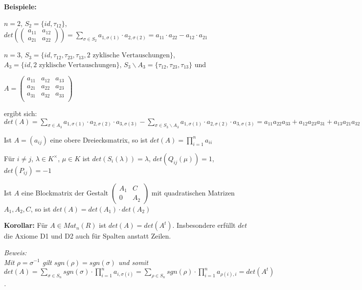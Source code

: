 \documentclass[11pt]{article}
\begin{document}
		\textbf{Beispiele:}
		\begin{compactitem}
			\item $n=2$, $S_2=\{id, \tau_{12}\}$, $det(\begin{pmatrix}a_{11} & a_{12} \\ a_{21}  & a_{22}\end{pmatrix})=\sum\limits_{\sigma\in
			S_2} a_{1,\sigma(1)}\cdot a_{2,\sigma(2)}=a_11\cdot a_22 - a_12\cdot a_21$
			\item $n=3$, $S_3=\{id,\tau_{12}, \tau_{23}, \tau_{13}, \text{2 zyklische Vertauschungen}\}$, $A_3=\{id, \text{2 zyklische 
			Vertauschungen}\}$, $S_3\backslash A_3=\{\tau_{12},\tau_{23},\tau_{13}\}$ und \\
			\begin{center}$A=\begin{pmatrix}
				a_{11} & a_{12} & a_{13} \\
				a_{21} & a_{22} & a_{23} \\
				a_{31} & a_{32} & a_{33} \\
			\end{pmatrix}$\end{center}
			ergibt sich: $det(A)=\sum\limits_{\sigma\in A_3} a_{1,\sigma(1)}\cdot a_{2,\sigma(2)}\cdot a_{3,\sigma(3)} - \sum\limits_
			{\sigma\in S_3\backslash A_3} a_{1,\sigma(1)}\cdot a_{2,\sigma(2)}\cdot a_{3,\sigma(3)}= a_{11}a_{22}a_{33} + a_{12}a_{23}
			a_{31} + a_{13}a_{21}a_{32} - a_{12}a_{21}a_{33} - a_{13}a_{22}a_{31} - a_{11}a_{23}a_{32}$
			\item Ist $A=(a_{ij})$ eine obere Dreiecksmatrix, so ist $det(A)=\prod\limits_{i=1}^n a_{ii}$
			\item Für $i\neq j$, $\lambda\in K^{\times}$, $\mu\in K$ ist $det(S_i(\lambda))=\lambda$, $det(Q_{ij}(\mu))=1$, $det(P_{ij})=-1$
			\item Ist $A$ eine Blockmatrix der Gestalt $\begin{pmatrix}A_1 & C \\ 0 & A_2\end{pmatrix}$ mit quadratischen Matrizen $A_1,
			A_2,C$, so ist $det(A)=det(A_1)\cdot det(A_2)$
		\end{compactitem}
		
		\begin{framed}
			\textbf{Korollar:} Für $A\in Mat_n(R)$ ist $det(A)=det(A^t)$. Insbesondere erfüllt $det$ die Axiome D1 und D2 auch für Spalten 
			anstatt Zeilen.
		\end{framed}
		\textit{Beweis: \\
		Mit $\rho=\sigma^{-1}$ gilt $sgn(\rho)=sgn(\sigma)$ und somit $det(A)=\sum\limits_{\sigma\in S_n} sgn(\sigma) \cdot \prod\limits_
		{i=1}^n a_{i,\sigma(i)}=\sum\limits_{\rho\in S_n} sgn(\rho)\cdot \prod\limits_{i=1}^n a_{\rho(i),i}=det(A^t)$.}
		
\end{document}
